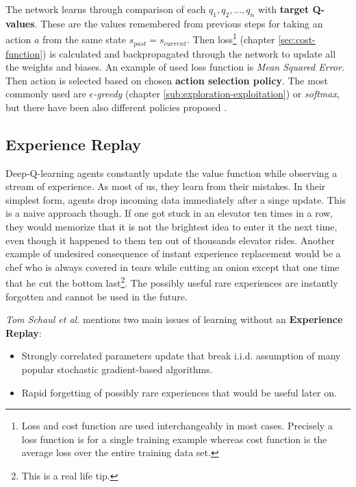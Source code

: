 \newpage

The network learns through comparison of each $q_1, q_2, ..., q_n$ with \textbf{target Q-values}. These are the values remembered from
previous steps for taking an action $a$ from the same state $s_{past} = s_{current}$. Then loss\footnote{Loss and cost function are
used interchangeably in most cases. Precisely a loss function is for a single training example whereas cost function is the average
loss over the entire training data set.} (chapter \ref{sec:cost-function}) is calculated and backpropagated through the network to update all
the weights and biases. An example of used loss function is \emph{Mean Squared Error}. Then action is selected based on chosen \textbf{action selection policy}. The most commonly used are
\emph{$\epsilon$-greedy} (chapter \ref{sub:exploration-exploitation}) or \emph{softmax}, but there have been also different policies
proposed
\cite{AdaptiveEGreedy}.

\subsection{Experience Replay}
\label{sub:experience-replay}

Deep-Q-learning agents constantly update the value function while observing a stream of experience. As most of us, they learn from their mistakes. In their simplest form, agents drop incoming data immediately after a singe update. This is a naive approach though. If one got stuck in an elevator ten times in a row, they would memorize that it is not the brightest idea to enter it the next time, even though it happened to them ten out of thousands elevator rides. Another example of undesired consequence of instant experience replacement would be a chef who is always covered in tears while cutting an onion except that one time that he cut the bottom last\footnote{This is a real life tip.}. The possibly useful rare experiences are instantly forgotten and cannot be used in the future.

\emph{Tom Schaul et al.} \cite{schaul2015prioritized} mentions two main issues of learning without an \textbf{Experience Replay}:

\begin{itemize}
    \item Strongly correlated parameters update that break i.i.d. assumption of many popular stochastic gradient-based algorithms.
    \item Rapid forgetting of possibly rare experiences that would be useful later on.
\end{itemize}

